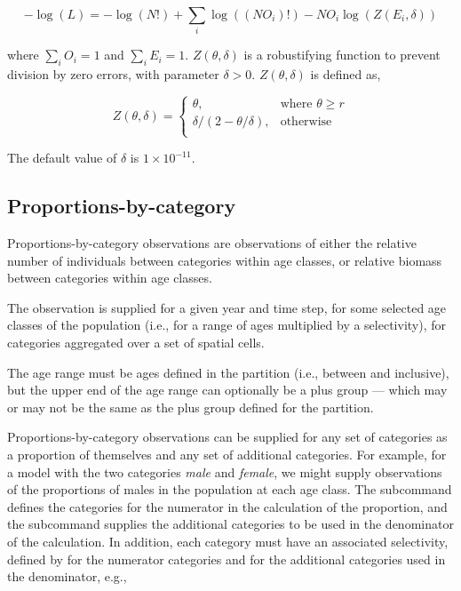 \begin{equation}
  -\log \left(L \right) =  -\log \left(N! \right) + \sum\limits_i \log \left( \left(NO_i \right)! \right) - NO_i \log \left(Z \left(E_i,\delta \right) \right)
\end{equation}

where $\sum\limits_i O_i = 1$ and $\sum\limits_i E_i = 1$. $Z \left(\theta,\delta \right)$ is a robustifying function to prevent division by zero errors, with parameter $\delta>0$. $Z \left(\theta,\delta \right)$ is defined as,

\begin{equation}
   Z \left(\theta,\delta \right) = \begin{cases}
	  \theta, & \text{where $\theta \ge r$} \\
	  \delta/\left( 2-\theta/\delta \right), & \text{otherwise} \\  
  \end{cases}
\end{equation}

The default value of $\delta$ is $1 \times 10^{-11}$.

\subsection{Proportions-by-category}

Proportions-by-category observations are observations of either the relative number of individuals between categories within age classes, or relative biomass between categories within age classes. 

The observation is supplied for a given year and time step, for some selected age classes of the population (i.e., for a range of ages multiplied by a selectivity), for categories aggregated over a set of spatial cells. 

The age range must be ages defined in the partition (i.e., between  and  inclusive), but the upper end of the age range can optionally be a plus group --- which may or may not be the same as the plus group defined for the partition. 

Proportions-by-category observations can be supplied for any set of categories as a proportion of themselves and any set of additional categories. For example, for a model with the two categories \emph{male} and \emph{female}, we might supply observations of the proportions of males in the population at each age class. The subcommand  defines the categories for the numerator in the calculation of the proportion, and the subcommand  supplies the additional categories to be used in the denominator of the calculation. In addition, each category must have an associated selectivity, defined by  for the numerator categories and  for the additional categories used in the denominator, e.g., 

